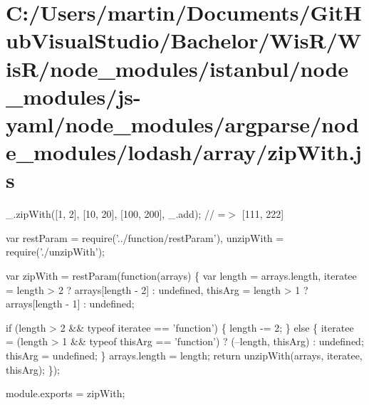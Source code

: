 \hypertarget{_c_1_2_users_2martin_2_documents_2_git_hub_visual_studio_2_bachelor_2_wis_r_2_wis_r_2node_modulef8d9d650ae45e2e715d5418fbfbaea55}{}\section{C\+:/\+Users/martin/\+Documents/\+Git\+Hub\+Visual\+Studio/\+Bachelor/\+Wis\+R/\+Wis\+R/node\+\_\+modules/istanbul/node\+\_\+modules/js-\/yaml/node\+\_\+modules/argparse/node\+\_\+modules/lodash/array/zip\+With.\+js}
\+\_\+.\+zip\+With(\mbox{[}1, 2\mbox{]}, \mbox{[}10, 20\mbox{]}, \mbox{[}100, 200\mbox{]}, \+\_\+.\+add); // =$>$ \mbox{[}111, 222\mbox{]}


\begin{DoxyCodeInclude}
var restParam = require(\textcolor{stringliteral}{'../function/restParam'}),
    unzipWith = require(\textcolor{stringliteral}{'./unzipWith'});

var zipWith = restParam(\textcolor{keyword}{function}(arrays) \{
  var length = arrays.length,
      iteratee = length > 2 ? arrays[length - 2] : undefined,
      thisArg = length > 1 ? arrays[length - 1] : undefined;

  \textcolor{keywordflow}{if} (length > 2 && typeof iteratee == \textcolor{stringliteral}{'function'}) \{
    length -= 2;
  \} \textcolor{keywordflow}{else} \{
    iteratee = (length > 1 && typeof thisArg == \textcolor{stringliteral}{'function'}) ? (--length, thisArg) : undefined;
    thisArg = undefined;
  \}
  arrays.length = length;
  \textcolor{keywordflow}{return} unzipWith(arrays, iteratee, thisArg);
\});

module.exports = zipWith;
\end{DoxyCodeInclude}
 